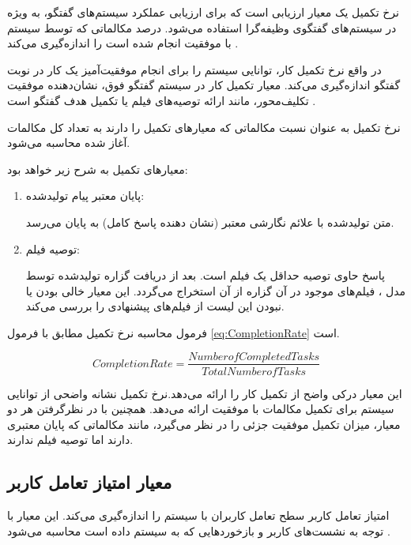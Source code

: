نرخ تکمیل یک معیار ارزیابی است که برای ارزیابی عملکرد سیستم‌های گفتگو، به ویژه در سیستم‌های گفتگوی وظیفه‌گرا استفاده می‌شود. درصد مکالماتی که توسط سیستم با موفقیت انجام شده است را اندازه‌گیری می‌کند%
\cite{sekulic2024reliable}
.

در واقع نرخ تکمیل کار، توانایی سیستم را برای انجام موفقیت‌آمیز یک کار در نوبت گفتگو اندازه‌گیری می‌کند. معیار تکمیل کار در سیستم گفتگو فوق، نشان‌دهنده موفقیت تکلیف‌محور، مانند ارائه توصیه‌های فیلم یا تکمیل هدف گفتگو است %
\cite{xu2024beyond}
.
 
نرخ تکمیل به عنوان نسبت مکالماتی که معیارهای تکمیل را دارند به تعداد کل مکالمات آغاز شده محاسبه می‌شود.

معیارهای تکمیل به شرح زیر خواهد بود:
\begin{enumerate}
\item
پایان معتبر پیام تولید‌شده: 

متن تولید‌شده با علائم نگارشی معتبر (نشان دهنده پاسخ کامل) به پایان می‌‌رسد.
\item
توصیه فیلم: 

پاسخ حاوی توصیه حداقل یک فیلم است. بعد از دریافت گزاره تولیدشده توسط مدل ، فیلم‌های موجود در آن گزاره از آن استخراج  می‌گردد. این معیار خالی بودن یا نبودن این لیست از فیلم‌های پیشنهادی را بررسی می‌کند.
\end{enumerate}

فرمول محاسبه نرخ تکمیل مطابق با فرمول 
\ref{eq:CompletionRate}
است.

\begin{LTR}
\begin{equation}
\label{eq:CompletionRate}
Completion Rate = \frac{Number of Completed Tasks}{Total Number of Tasks}
\end{equation}
\end{LTR}



این معیار درکی واضح از تکمیل کار را ارائه می‌دهد.نرخ تکمیل نشانه واضحی از توانایی سیستم برای تکمیل مکالمات با موفقیت ارائه می‌دهد.
همچنین با در نظرگرفتن هر دو معیار، میزان تکمیل موفقیت جزئی را در نظر می‌گیرد، مانند مکالماتی که پایان معتبری دارند اما توصیه فیلم ندارند.

\subsection[معیار امتیاز تعامل کاربر]{معیار امتیاز تعامل کاربر}

امتیاز تعامل کاربر سطح تعامل کاربران با سیستم را اندازه‌گیری می‌کند. این معیار با توجه به نشست‌های کاربر و بازخوردهایی که به سیستم داده است محاسبه می‌شود
\cite{es2023ragas}
.

